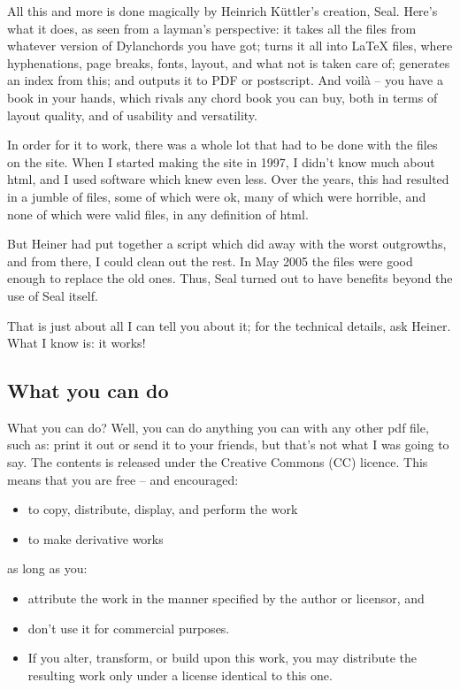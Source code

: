 All this and more is done magically by Heinrich K\"uttler's creation,
Seal. Here's what it does, as seen from a layman's perspective: it
takes all the files from whatever version of Dylanchords you have got;
turns it all into LaTeX files, where hyphenations, page breaks, fonts,
layout, and what not is taken care of; generates an index from this;
and outputs it to PDF or postscript. And voil\`a -- you have a book
in your hands, which rivals any chord book you can buy, both in terms
of layout quality, and of usability and versatility.
 
In order for it to work, there was a whole lot that had to be done
with the files on the site. When I started making the site in 1997, I
didn't know much about html, and I used software which knew even
less. Over the years, this had resulted in a jumble of files, some of
which were ok, many of which were horrible, and none of which were
valid files, in any definition of html.
 
But Heiner had put together a script which did away with the worst
outgrowths, and from there, I could clean out the rest. In May 2005
the files were good enough to replace the old ones. Thus, Seal turned
out to have benefits beyond the use of Seal itself.
 
That is just about all I can tell you about it; for the technical
details, ask Heiner. What I know is: it works!

\subsection*{What you can do}
 
What you can do? Well, you can do anything you can with any other pdf
file, such as: print it out or send it to your friends, but that's not
what I was going to say. The contents is released under the Creative
Commons (CC) licence. This means that you are free -- and encouraged:

\begin{itemize}
  \item to copy, distribute, display, and perform the work
  \item to make derivative works
\end{itemize}

as long as you:
\begin{itemize}
  \item attribute the work in the manner specified by the author or
    licensor, and
  \item don't use it for commercial purposes.
  \item If you alter, transform, or build upon this work, you may
    distribute the resulting work only under a license identical to
    this one.
\end{itemize}
 
